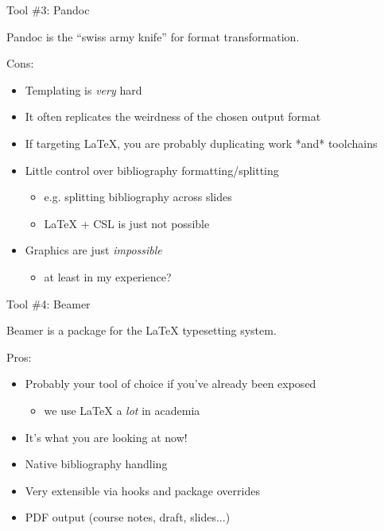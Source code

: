 \documentclass[aspectratio=169]{divoc}
\begin{document}
\begin{frame}{Tool \#3: Pandoc}
  \begin{center}
    Pandoc is the \enquote{swiss army knife} for format transformation.
  \end{center}

  Cons:

  \begin{itemize}
    \item Templating is \emph{very} hard
    \item It often replicates the weirdness of the chosen output format
    \item If targeting LaTeX, you are probably duplicating work *and* toolchains
    \item Little control over bibliography formatting/splitting
          \begin{itemize}
            \item e.g. splitting bibliography across slides
            \item LaTeX + CSL is just not possible
          \end{itemize}
    \item Graphics are just \emph{impossible}
          \begin{itemize}
            \item at least in my experience?
          \end{itemize}
  \end{itemize}
\end{frame}
\begin{frame}{Tool \#4: Beamer}
  \begin{center}
    Beamer is a package for the LaTeX typesetting system.
  \end{center}

  Pros:
  \begin{itemize}
    \item Probably your tool of choice if you've already been exposed
          \begin{itemize}
            \item we use LaTeX a \emph{lot} in academia
          \end{itemize}
    \item It's what you are looking at now!
    \item Native bibliography handling
    \item Very extensible via hooks and package overrides
    \item PDF output (course notes, draft, slides...)
  \end{itemize}
\end{frame}
\end{document}
